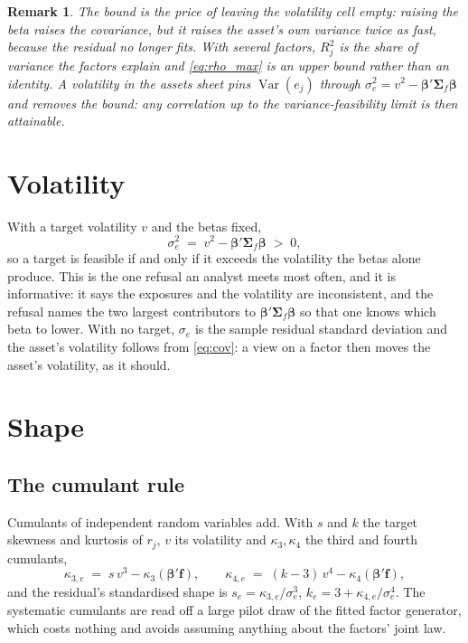 \documentclass[11pt]{article}
\newtheorem{remark}{Remark}
\DeclareMathOperator{\Var}{Var}
\newcommand{\bbeta}{\boldsymbol\beta}
\newcommand{\bSigma}{\boldsymbol\Sigma}
\newcommand{\bff}{\mathbf f}
\begin{document}
\begin{remark}
The bound is the price of leaving the volatility cell empty: raising the beta
raises the covariance, but it raises the asset's own variance twice as fast,
because the residual no longer fits. With several factors, $R_j^2$ is the share
of variance the factors explain and \eqref{eq:rho_max} is an upper bound rather
than an identity. A volatility in the assets sheet pins $\Var(e_j)$ through
$\sigma_{e}^2 = v^2 - \bbeta'\bSigma_f\bbeta$ and removes the bound: any
correlation up to the variance-feasibility limit is then attainable.
\end{remark}

\section{Volatility}

With a target volatility $v$ and the betas fixed,
\begin{equation}\label{eq:vol}
  \sigma_e^2 \;=\; v^2 - \bbeta'\bSigma_f\bbeta \;>\; 0 ,
\end{equation}
so a target is feasible if and only if it exceeds the volatility the betas
alone produce. This is the one refusal an analyst meets most often, and it is
informative: it says the exposures and the volatility are inconsistent, and the
refusal names the two largest contributors to $\bbeta'\bSigma_f\bbeta$ so that
one knows which beta to lower. With no target, $\sigma_e$ is the sample residual
standard deviation and the asset's volatility follows from \eqref{eq:cov}: a
view on a factor then moves the asset's volatility, as it should.

\section{Shape}

\subsection{The cumulant rule}

Cumulants of independent random variables add. With $s$ and $k$ the target
skewness and kurtosis of $r_j$, $v$ its volatility and $\kappa_3, \kappa_4$ the
third and fourth cumulants,
\begin{equation}\label{eq:cumulants}
  \kappa_{3,e} \;=\; s\,v^3 - \kappa_3(\bbeta'\bff), \qquad
  \kappa_{4,e} \;=\; (k - 3)\,v^4 - \kappa_4(\bbeta'\bff),
\end{equation}
and the residual's standardised shape is $s_e = \kappa_{3,e}/\sigma_e^3$,
$k_e = 3 + \kappa_{4,e}/\sigma_e^4$. The systematic cumulants are read off a
large pilot draw of the fitted factor generator, which costs nothing and avoids
assuming anything about the factors' joint law.
\end{document}
